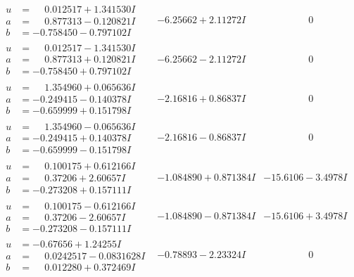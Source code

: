 \documentclass[1p]{elsarticle_modified}
\theoremstyle{definition}
\begin{document}
$$\begin{array}{c|c|c}
\begin{aligned}
u &= \phantom{-}0.012517 + 1.341530 I \\
a &= \phantom{-}0.877313 - 0.120821 I \\
b &= -0.758450 - 0.797102 I\end{aligned}
 & -6.25662 + 2.11272 I & \phantom{-0.000000 } 0 \\ \hline\begin{aligned}
u &= \phantom{-}0.012517 - 1.341530 I \\
a &= \phantom{-}0.877313 + 0.120821 I \\
b &= -0.758450 + 0.797102 I\end{aligned}
 & -6.25662 - 2.11272 I & \phantom{-0.000000 } 0 \\ \hline\begin{aligned}
u &= \phantom{-}1.354960 + 0.065636 I \\
a &= -0.249415 - 0.140378 I \\
b &= -0.659999 + 0.151798 I\end{aligned}
 & -2.16816 + 0.86837 I & \phantom{-0.000000 } 0 \\ \hline\begin{aligned}
u &= \phantom{-}1.354960 - 0.065636 I \\
a &= -0.249415 + 0.140378 I \\
b &= -0.659999 - 0.151798 I\end{aligned}
 & -2.16816 - 0.86837 I & \phantom{-0.000000 } 0 \\ \hline\begin{aligned}
u &= \phantom{-}0.100175 + 0.612166 I \\
a &= \phantom{-}0.37206 + 2.60657 I \\
b &= -0.273208 + 0.157111 I\end{aligned}
 & -1.084890 + 0.871384 I & -15.6106 - 3.4978 I \\ \hline\begin{aligned}
u &= \phantom{-}0.100175 - 0.612166 I \\
a &= \phantom{-}0.37206 - 2.60657 I \\
b &= -0.273208 - 0.157111 I\end{aligned}
 & -1.084890 - 0.871384 I & -15.6106 + 3.4978 I \\ \hline\begin{aligned}
u &= -0.67656 + 1.24255 I \\
a &= \phantom{-}0.0242517 - 0.0831628 I \\
b &= \phantom{-}0.012280 + 0.372469 I\end{aligned}
 & -0.78893 - 2.23324 I & \phantom{-0.000000 } 0 \\ \hline\begin{aligned}

\end{aligned}
\end{array}$$
\end{document}
